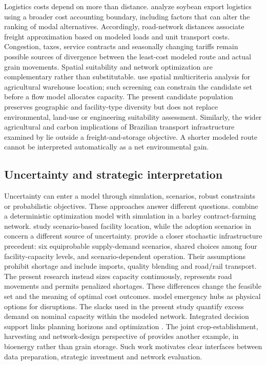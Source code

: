 \documentclass[
  english,
  11pt,
  a4paper,
  authoryear,
  preprint]{elsarticle}
\begin{document}
Logistics costs depend on more than distance.
\citet{kussano2012} analyze soybean export logistics using a broader
cost accounting boundary, including factors that can alter the ranking
of modal alternatives. Accordingly, road-network distances associate freight approximation based on modeled loads and unit transport costs.
Congestion, taxes, service contracts and seasonally changing tariffs
remain possible sources of divergence between the least-cost modeled
route and actual grain movements.
Spatial suitability and network optimization are complementary rather
than substitutable. \citet{souza2024} use spatial multicriteria analysis
for agricultural warehouse location; such screening can constrain the
candidate set before a flow model allocates capacity. The present
candidate population preserves geographic and facility-type diversity
but does not replace environmental, land-use or engineering suitability
assessment. Similarly, the wider agricultural and carbon implications of
Brazilian transport infrastructure examined by \citet{wang2024} lie
outside a freight-and-storage objective. A shorter modeled route cannot
be interpreted automatically as a net environmental gain.

\subsection{Uncertainty and strategic
interpretation}\label{uncertainty-and-strategic-interpretation}

Uncertainty can enter a model through simulation, scenarios, robust
constraints or probabilistic objectives. These approaches answer
different questions. \citet{granillo2019} combine a deterministic
optimization model with simulation in a barley contract-farming network.
\citet{mendoza2021} study scenario-based facility location, while the
adoption scenarios in \citet{vazquez2021} concern a different source of
uncertainty.
\citet{pourmohammadi2020} provide a closer stochastic infrastructure
precedent: six equiprobable supply-demand scenarios, shared choices
among four facility-capacity levels, and scenario-dependent operation.
Their assumptions prohibit shortage and include imports, quality
blending and road/rail transport. The present research instead sizes
capacity continuously, represents road movements and permits penalized
shortages. These differences change the feasible set and the meaning of
optimal cost outcomes.
\citet{maiyar2019} model emergency hubs as physical options for
disruptions. The slacks used in the present study quantify excess demand
on nominal capacity within the modeled network.
Integrated decision support links planning horizons and optimization \citep{mardaneh2021}. The joint
crop-establishment, harvesting and network-design perspective of \citet{anselmino2025} provides another example, in bioenergy rather than
grain storage. Such work motivates clear interfaces between data preparation, strategic investment and network evaluation.
\end{document}
